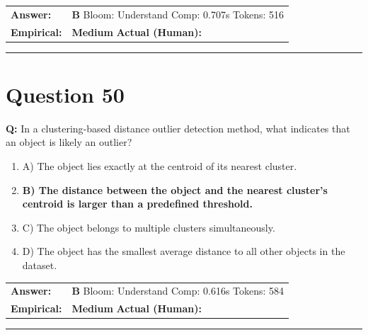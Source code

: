\documentclass[9pt]{article}
\begin{document}
\begin{tabular}{@{}l p{10.5cm}@{}}
\textbf{Answer:} & \textbf{B} \hspace{1em} Bloom: Understand \hspace{1em} Comp: 0.707s \hspace{1em} Tokens: 516 \\
\textbf{Empirical:} & \textbf{Medium} \hspace{1em} \textbf{Actual (Human):} \underline{\hspace{5cm}}
\end{tabular}

\vspace{0.2cm}
\rule{\textwidth}{0.4pt}
\vspace{0.2cm}


\section*{Question 50}

\textbf{Q:} In a clustering‑based distance outlier detection method, what indicates that an object is likely an outlier?

\begin{enumerate}[label=\textbf{\alph{*})}, nosep]
    \item A) The object lies exactly at the centroid of its nearest cluster.
    \item \textbf{B) The distance between the object and the nearest cluster’s centroid is larger than a predefined threshold.} %
    \item C) The object belongs to multiple clusters simultaneously.
    \item D) The object has the smallest average distance to all other objects in the dataset.

\end{enumerate}

\begin{tabular}{@{}l p{10.5cm}@{}}
\textbf{Answer:} & \textbf{B} \hspace{1em} Bloom: Understand \hspace{1em} Comp: 0.616s \hspace{1em} Tokens: 584 \\
\textbf{Empirical:} & \textbf{Medium} \hspace{1em} \textbf{Actual (Human):} \underline{\hspace{5cm}}
\end{tabular}

\vspace{0.2cm}
\rule{\textwidth}{0.4pt}
\vspace{0.2cm}
\end{document}
